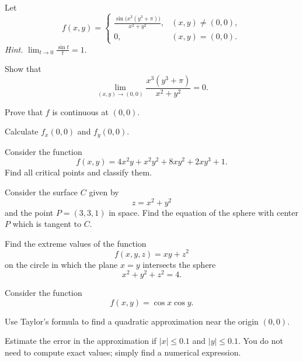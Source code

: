 \begin{problem}
Let
\[
f(x, y)=
\begin{cases}
\displaystyle\frac{\sin\!\bigl(x^3(y^3+\pi)\bigr)}{x^2+y^2}, & (x, y)\ne(0, 0), \\[0.6em]
0, & (x, y)=(0, 0).
\end{cases}
\]
\textit{Hint.} $\displaystyle\lim_{t\to0}\frac{\sin t}{t}=1$.
\begin{problemsubparts}
\item Show that
\[
\lim_{(x, y)\to(0, 0)}\frac{x^3(y^3+\pi)}{x^2+y^2}=0.
\]
\item Prove that $f$ is continuous at $(0, 0)$.
\item Calculate $f_x(0, 0)$ and $f_y(0, 0)$.
\end{problemsubparts}
\end{problem}

\begin{problem}
Consider the function
\[
f(x, y)=4x^2y+x^2y^2+8xy^2+2xy^3+1.
\]
Find all critical points and classify them.
\end{problem}

\begin{problem}
Consider the surface $C$ given by
\[
z=x^2+y^2
\]
and the point $P=(3, 3, 1)$ in space. Find the equation of the sphere with center $P$ which is tangent to $C$.
\end{problem}

\begin{problem}
Find the extreme values of the function
\[
f(x, y, z)=xy+z^2
\]
on the circle in which the plane $x=y$ intersects the sphere
\[
x^2+y^2+z^2=4.
\]
\end{problem}

\begin{problem}
Consider the function
\[
f(x, y)=\cos x\cos y.
\]
\begin{problemsubparts}
\item Use Taylor's formula to find a quadratic approximation near the origin $(0, 0)$.
\item Estimate the error in the approximation if $|x|\le0.1$ and $|y|\le0.1$. You do not need to compute exact values; simply find a numerical expression.
\end{problemsubparts}
\end{problem}

